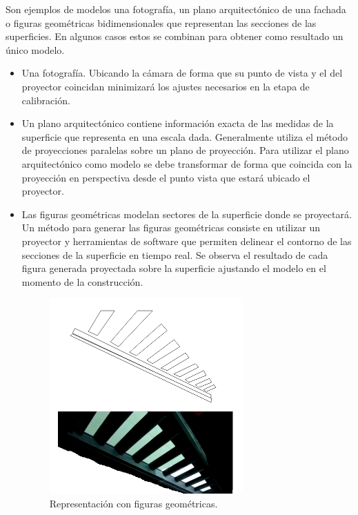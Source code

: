 Son ejemplos de modelos una fotografía, un plano arquitectónico de una fachada o figuras geométricas bidimensionales que representan las secciones de las superficies.
En algunos casos estos se combinan para obtener como resultado un único modelo.
\begin{itemize}
  \item Una fotografía. Ubicando la cámara de forma que su punto de vista y el del proyector coincidan minimizará los ajustes necesarios en la etapa de calibración.%
  \item Un plano arquitectónico contiene información exacta de las medidas de la superficie que representa en una escala dada. Generalmente utiliza el método de proyecciones paralelas \cite{LibroCompGrafica} sobre un plano de proyección. Para utilizar el plano arquitectónico como modelo se debe transformar de forma que coincida con la proyección en perspectiva desde el punto vista que estará ubicado el proyector.
  \item Las figuras geométricas modelan sectores de la superficie donde se proyectará. Un método para generar las figuras geométricas consiste en utilizar un proyector y herramientas de software que permiten delinear el contorno de las secciones de la superficie en tiempo real. Se observa el resultado de cada figura generada proyectada sobre la superficie ajustando el modelo en el momento de la construcción.%
\begin{figure}[H]
  \centering
    \includegraphics[width=0.7\textwidth]{./Cap2_videomapping/RepresentacionconfigurasGeometricas}
  \caption{Representación con figuras geométricas.}%
  \label{fig:RepresentacionconfigurasGeometricas}
\end{figure}


\end{itemize}
